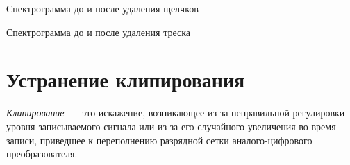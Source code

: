 \documentclass{beamer}
\begin{document}
\begin{frame}
Спектрограмма до и после удаления щелчков

\end{frame}

\begin{frame}
Спектрограмма до и после удаления треска

\end{frame}


\section{Устранение клипирования}
\begin{frame}
\textit{Клипирование}~--- это искажение, возникающее из-за неправильной регулировки уровня записываемого сигнала или из-за его случайного увеличения во время записи, приведшее к переполнению разрядной сетки аналого-цифрового преобразователя.

~

\end{frame}
\end{document}
